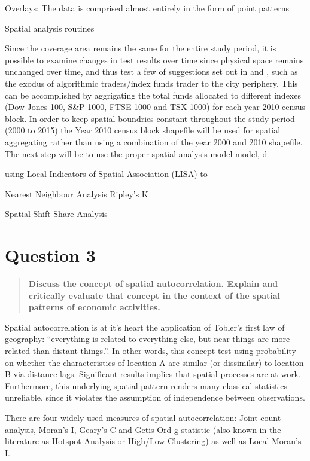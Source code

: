 \documentclass[12pt,letterpaper,notitlepage,onecolumn,final,openbib]{article}
\begin{document}
Overlays:
The data is comprised almost entirely in the form of point patterns 

Spatial analysis routines 

Since the coverage area remains the same for the entire study period, it is possible to examine changes in test results over time since physical space remains unchanged over time, and thus test a few of suggestions set out in  and , such as the exodus of algorithmic traders/index funds trader to the city periphery.  This can be accomplished by aggrigating the total funds allocated to different indexes (Dow-Jones 100, S\&P 1000, FTSE 1000 and TSX 1000) for each year 2010 census block.  In order to keep spatial boundries constant throughout the study period (2000 to 2015) the Year 2010 census block shapefile will be used for spatial aggregating rather than using a combination of the year 2000 and 2010 shapefile.  The next step will be to use the proper spatial analysis model model, d

using Local Indicators of Spatial Association (LISA) to 

   
Nearest Neighbour Analysis 
Ripley's K

Spatial Shift-Share Analysis \cite{ShiftShare2008}


\section{Question 3}
\begin{quotation}
\textbf{Discuss the concept of spatial autocorrelation. Explain and critically evaluate that concept in the context of the spatial patterns of economic activities.}
\end{quotation}

Spatial autocorrelation is at it's heart the application of Tobler's first law of geography: ``everything is related to everything else, but near things are more related than distant things.''\cite[page  236]{toblera1970}.  In other words, this concept test using probability on whether the characteristics of location A are similar (or dissimilar) to location B via distance lags.   Significant results implies that spatial processes are at work.  Furthermore, this underlying spatial pattern renders many classical statistics unreliable, since it violates the assumption of independence between observations\cite{fischer2009handbook}. 

There are four widely used measures of spatial autocorrelation: Joint count analysis, Moran's I, Geary's C and Getis-Ord g statistic (also known in the literature as Hotspot Analysis or High/Low Clustering) as well as Local Moran's I.  
\end{document}
